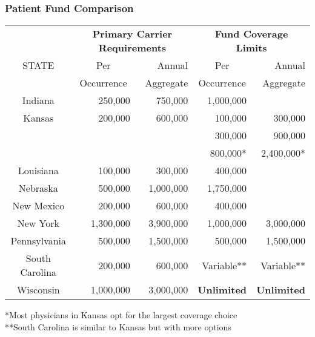 \documentclass[serif,10pt]{beamer}
\begin{document}
\begin{frame}
\frametitle{Patient Fund Comparison}
\begin{table}[htbp]
  \centering
    \begin{tabular}{|c|rr|rr|}
    \hline
           & \multicolumn{2}{c|}{\textbf{Primary Carrier Requirements}} & \multicolumn{2}{c|}{\textbf{Fund Coverage Limits}} \\
     STATE & \multicolumn{1}{c}{Per}  & \multicolumn{1}{r|}{Annual}  & \multicolumn{1}{c}{Per}  & \multicolumn{1}{r|}{Annual}  \\
           & \multicolumn{1}{c}{Occurrence} &  \multicolumn{1}{r|}{Aggregate} & \multicolumn{1}{c}{Occurrence} &  \multicolumn{1}{r|}{Aggregate} \\
    \hline
    Indiana & 250,000  & 750,000  & 1,000,000  &  \\
    Kansas & 200,000  & 600,000  & 100,000  & 300,000  \\
           &       &       & 300,000  & 900,000  \\
          &       &       & 800,000*  & 2,400,000*  \\
    \hline
    Louisiana & 100,000  & 300,000  & 400,000  &  \\
    Nebraska & 500,000  & 1,000,000  & 1,750,000  &  \\
    \hline
    New Mexico & 200,000  & 600,000  & 400,000  &  \\
    New York & 1,300,000  & 3,900,000  & 1,000,000  & 3,000,000  \\
    \hline
    Pennsylvania & 500,000  & 1,500,000  & 500,000  & 1,500,000  \\
    South Carolina & 200,000  & 600,000  & Variable**  & Variable** \\
    \hline
    Wisconsin & 1,000,000  & 3,000,000  & \textbf{Unlimited} & \textbf{Unlimited} \\
    \hline
    \end{tabular}
  \label{tab:addlabel}
\end{table}

\bigskip
*Most physicians in Kansas opt for the largest coverage choice \\
**South Carolina is similar to Kansas but with more options
\end{frame}
\end{document}
